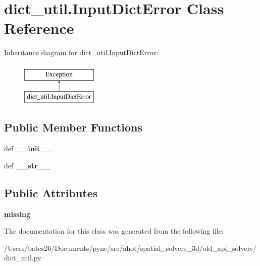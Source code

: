 \hypertarget{classdict__util_1_1_input_dict_error}{\section{dict\+\_\+util.\+Input\+Dict\+Error Class Reference}
\label{classdict__util_1_1_input_dict_error}
}
Inheritance diagram for dict\+\_\+util.\+Input\+Dict\+Error\+:\begin{figure}[H]
\begin{center}
\leavevmode
\includegraphics[height=2.000000cm]{classdict__util_1_1_input_dict_error}
\end{center}
\end{figure}
\subsection*{Public Member Functions}
\begin{DoxyCompactItemize}
\item 
\hypertarget{classdict__util_1_1_input_dict_error_a4e97e96ffaf431264fbaa99f89aa4e36}{def {\bfseries \+\_\+\+\_\+init\+\_\+\+\_\+}}\label{classdict__util_1_1_input_dict_error_a4e97e96ffaf431264fbaa99f89aa4e36}

\item 
\hypertarget{classdict__util_1_1_input_dict_error_a7227b403f5bdaba9ef675cb9cf1111e8}{def {\bfseries \+\_\+\+\_\+str\+\_\+\+\_\+}}\label{classdict__util_1_1_input_dict_error_a7227b403f5bdaba9ef675cb9cf1111e8}

\end{DoxyCompactItemize}
\subsection*{Public Attributes}
\begin{DoxyCompactItemize}
\item 
\hypertarget{classdict__util_1_1_input_dict_error_aa2ebc135b20ddafa9bae59e28bf417f1}{{\bfseries missing}}\label{classdict__util_1_1_input_dict_error_aa2ebc135b20ddafa9bae59e28bf417f1}

\end{DoxyCompactItemize}


The documentation for this class was generated from the following file\+:\begin{DoxyCompactItemize}
\item 
/\+Users/bates26/\+Documents/pyne/src/ahot/spatial\+\_\+solvers\+\_\+3d/old\+\_\+api\+\_\+solvers/dict\+\_\+util.\+py\end{DoxyCompactItemize}

